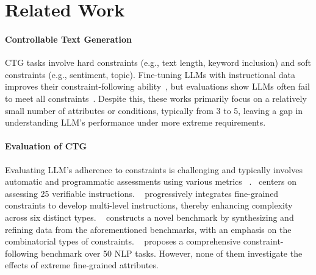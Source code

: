 \section{Related Work}
\paragraph{Controllable Text Generation}
CTG tasks involve hard constraints (e.g., text length, keyword inclusion)\cite{takase2019positional, carlsson2022fine} and soft constraints (e.g., sentiment, topic)\cite{gu-etal-2022-distributional, NEURIPS2022_b125999b}. Fine-tuning LLMs with instructional data improves their constraint-following ability~\cite{weller-etal-2020-learning, sanh2021multitask, mishra-etal-2022-cross, DBLP:journals/corr/abs-2402-11905}, but evaluations show LLMs often fail to meet all constraints~\cite{jiang2023followbench, qin2024infobench, ren2025step}. 
Despite this, these works primarily focus on a relatively small number of attributes or conditions, typically from 3 to 5, leaving a gap in understanding LLM's performance under more extreme requirements.

\paragraph{Evaluation of CTG}
Evaluating LLM's adherence to constraints is challenging and typically involves automatic and programmatic assessments using various metrics ~\cite{yao2023collie,zhou2023controlled,chen2022controllable}.~\citet{zhou2023instruction} centers on assessing 25 verifiable instructions.  ~\citet{jiang2023followbench} progressively integrates fine-grained constraints to develop multi-level instructions, thereby enhancing complexity across six distinct types. ~\citet{wen2024benchmarking} constructs a novel benchmark by synthesizing and refining data from the aforementioned benchmarks, with an emphasis on the combinatorial types of constraints. ~\citet{zhang2024cfbench} proposes a comprehensive constraint-following benchmark over 50 NLP tasks. However, none of them investigate the effects of extreme fine-grained attributes.

